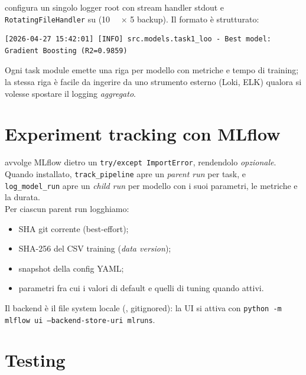  configura un singolo logger root con stream
handler stdout e \texttt{RotatingFileHandler} su
 (\SI{10}{\mega\byte} $\times$ 5 backup). Il
formato è strutturato:
\begin{lstlisting}
[2026-04-27 15:42:01] [INFO] src.models.task1_loo - Best model: Gradient Boosting (R2=0.9859)
\end{lstlisting}

Ogni task module emette una riga per modello con metriche e tempo di
training; la stessa riga è facile da ingerire da uno strumento esterno
(Loki, ELK) qualora si volesse spostare il logging \emph{aggregato}.

\section{Experiment tracking con MLflow}

 avvolge MLflow dietro un \texttt{try/except
ImportError}, rendendolo \emph{opzionale}. Quando installato,
\texttt{track\_pipeline} apre un \emph{parent run} per task, e
\texttt{log\_model\_run} apre un \emph{child run} per modello con i suoi
parametri, le metriche e la durata.
\\Per ciascun parent run logghiamo:
\begin{itemize}
  \item SHA git corrente (best-effort);
  \item SHA-256 del CSV training (\emph{data version});
  \item snapshot della config YAML;
  \item parametri fra cui i valori di default e quelli di tuning quando
        attivi.
\end{itemize}

Il backend è il file system locale (, gitignored): la UI
si attiva con \texttt{python -m mlflow ui --backend-store-uri mlruns}.

\section{Testing}


